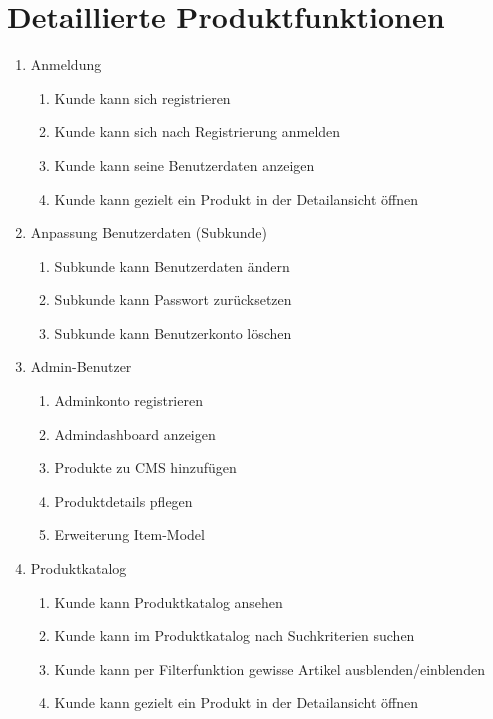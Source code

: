 \documentclass[%
	12pt,
	a4paper,
	oneside,
	parskip=full
]{scrbook}
\begin{document}
\chapter{Detaillierte Produktfunktionen}
\begin{enumerate}[label=F\arabic*]
    \item Anmeldung
    \begin{enumerate}[label=F\arabic{enumi}.\arabic*]
        \item Kunde kann sich registrieren
        \item Kunde kann sich nach Registrierung anmelden
        \item Kunde kann seine Benutzerdaten anzeigen
        \item Kunde kann gezielt ein Produkt in der Detailansicht öffnen
    \end{enumerate}
    
    \item Anpassung Benutzerdaten (Subkunde)
    \begin{enumerate}[label=F\arabic{enumi}.\arabic*]
        \item Subkunde kann Benutzerdaten ändern
        \item Subkunde kann Passwort zurücksetzen
        \item Subkunde kann Benutzerkonto löschen
    \end{enumerate}
    
    \item Admin-Benutzer
    \begin{enumerate}[label=F\arabic{enumi}.\arabic*]
        \item Adminkonto registrieren
        \item Admindashboard anzeigen
        \item Produkte zu CMS hinzufügen
        \item Produktdetails pflegen
        \item Erweiterung Item-Model
    \end{enumerate}
    
    \item Produktkatalog
    \begin{enumerate}[label=F\arabic{enumi}.\arabic*]
        \item Kunde kann Produktkatalog ansehen
        \item Kunde kann im Produktkatalog nach Suchkriterien suchen
        \item Kunde kann per Filterfunktion gewisse Artikel ausblenden/einblenden
        \item Kunde kann gezielt ein Produkt in der Detailansicht öffnen
    \end{enumerate}
\end{enumerate}
\end{document}
